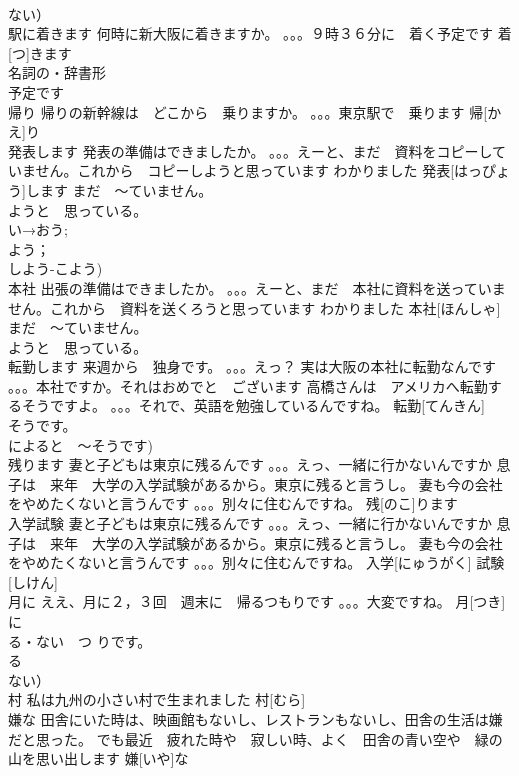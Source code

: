 \documentclass[8pt]{extreport}
\begin{document}
\begin{CJK}{UTF8}{min}
\\	ない）
\\	駅に着きます	何時に新大阪に着きますか。 。。。９時３６分に　着く予定です	着[つ]きます			
\\	名詞の・辞書形
\\	予定です
\\	帰り	帰りの新幹線は　どこから　乗りますか。 。。。東京駅で　乗ります	帰[かえ]り			
\\	発表します	発表の準備はできましたか。 。。。えーと、まだ　資料をコピーしていません。これから　コピーしようと思っています わかりました	発表[はっぴょう]します				まだ　～ていません。
\\	ようと　思っている。
\\	い→おう;
\\	よう；
\\	しよう-こよう)
\\	本社	出張の準備はできましたか。 。。。えーと、まだ　本社に資料を送っていません。これから　資料を送くろうと思っています わかりました	本社[ほんしゃ]				まだ　～ていません。
\\	ようと　思っている。
\\	転勤します	来週から　独身です。 。。。えっ？ 実は大阪の本社に転勤なんです 。。。本社ですか。それはおめでと　ございます 高橋さんは　アメリカへ転勤するそうですよ。 。。。それで、英語を勉強しているんですね。	転勤[てんきん]			
\\	そうです。
\\	によると　～そうです)	
\\	残ります	妻と子どもは東京に残るんです 。。。えっ、一緒に行かないんですか 息子は　来年　大学の入学試験があるから。東京に残ると言うし。 妻も今の会社をやめたくないと言うんです 。。。別々に住むんですね。	残[のこ]ります			
\\	入学試験	妻と子どもは東京に残るんです 。。。えっ、一緒に行かないんですか 息子は　来年　大学の入学試験があるから。東京に残ると言うし。 妻も今の会社をやめたくないと言うんです 。。。別々に住むんですね。	入学[にゅうがく] 試験[しけん]					
\\	月に	ええ、月に２，３回　週末に　帰るつもりです 。。。大変ですね。	月[つき]に			
\\	る・ない　つ りです。
\\	る
\\	ない）
\\	村	私は九州の小さい村で生まれました	村[むら]			
\\	嫌な	田舎にいた時は、映画館もないし、レストランもないし、田舎の生活は嫌だと思った。 でも最近　疲れた時や　寂しい時、よく　田舎の青い空や　緑の山を思い出します	嫌[いや]な			

\end{CJK}
\end{document}
